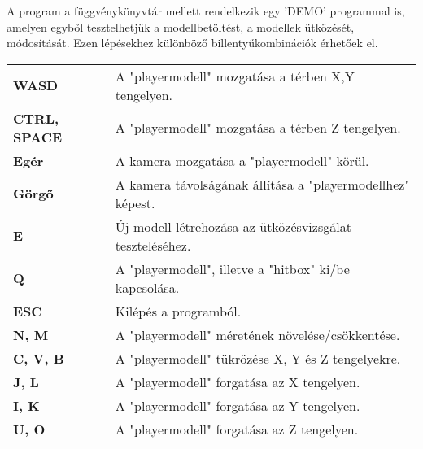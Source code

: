 
A program a függvénykönyvtár mellett rendelkezik egy 'DEMO' programmal is, amelyen egyből tesztelhetjük a modellbetöltést, a modellek ütközését, módosítását. Ezen lépésekhez különböző billentyűkombinációk érhetőek el.
\begin{table}[h]
	\centering
	\begin{tabular}{l l}
		\textbullet\textbf{ WASD} & {A "playermodell" mozgatása a térben X,Y tengelyen.} \\
		\textbullet\textbf{ CTRL, SPACE} & A "playermodell" mozgatása a térben Z tengelyen. \\
		\textbullet\textbf{ Egér} & A kamera mozgatása a "playermodell" körül. \\
		\textbullet\textbf{ Görgő} & A kamera távolságának állítása a "playermodellhez" képest. \\
		\textbullet\textbf{ E} & Új modell létrehozása az ütközésvizsgálat teszteléséhez. \\
		\textbullet\textbf{ Q} & A "playermodell", illetve a "hitbox" ki/be kapcsolása. \\
		\textbullet\textbf{ ESC} & Kilépés a programból. \\
		\textbullet\textbf{ N, M} & A "playermodell" méretének növelése/csökkentése. \\
		\textbullet\textbf{ C, V, B} & A "playermodell" tükrözése X, Y és Z tengelyekre. \\
		\textbullet\textbf{ J, L} & A "playermodell" forgatása az X tengelyen. \\
		\textbullet\textbf{ I, K} & A "playermodell" forgatása az Y tengelyen. \\
		\textbullet\textbf{ U, O} & A "playermodell" forgatása az Z tengelyen. 
	\end{tabular}
\end{table}

\newpage


